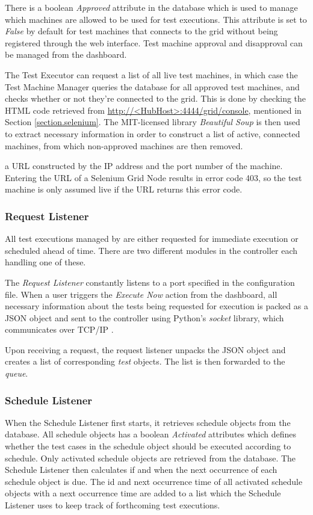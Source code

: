 There is a boolean \emph{Approved} attribute in the database which is used to manage which machines are allowed to be used for test executions. This attribute is set to \emph{False} by default for test machines that connects to the grid without being registered through the web interface. Test machine approval and disapproval can be managed from the dashboard.

The Test Executor can request a list of all live test machines, in which case the Test Machine Manager queries the database for all approved test machines, and checks whether or not they're connected to the grid. This is done by checking the HTML code retrieved from \url{http://<HubHost>:4444/grid/console}, mentioned in Section \ref{section.selenium}. The MIT-licensed library \emph{Beautiful Soup} is then used to extract necessary information in order to construct a list of active, connected machines, from which non-approved machines are then removed.

a URL constructed by the IP address and the port number of the machine. Entering the URL of a Selenium Grid Node results in error code 403, so the test machine is only assumed live if the URL returns this error code.

\subsubsection{Request Listener}

All test executions managed by \toolname \space are either requested for immediate execution or scheduled ahead of time. There are two different modules in the controller each handling one of these.

The \emph{Request Listener} constantly listens to a port specified in the configuration file. When a user triggers the \emph{Execute Now} action from the dashboard, all necessary information about the tests being requested for execution is packed as a JSON object and sent to the controller using Python's \emph{socket} library, which communicates over TCP/IP \cite{https://docs.python.org/3/library/socket.html / https://docs.python.org/3/library/socket.html}.

Upon receiving a request, the request listener unpacks the JSON object and creates a list of corresponding \emph{test} objects. The list is then forwarded to the \emph{queue}.


\subsubsection{Schedule Listener}
When the Schedule Listener first starts, it retrieves schedule objects from the database. All schedule objects has a boolean \emph{Activated} attributes which defines whether the test cases in the schedule object should be executed according to schedule. Only activated schedule objects are retrieved from the database. The Schedule Listener then calculates if and when the next occurrence of each schedule object is due. The id and next occurrence time of all activated schedule objects with a next occurrence time are added to a list which the Schedule Listener uses to keep track of forthcoming test executions.

